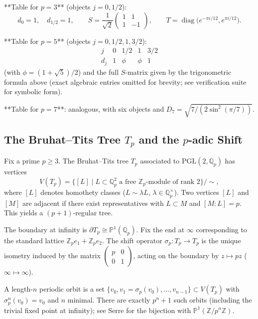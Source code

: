 \documentclass[11pt,a4paper]{amsart}
\begin{document}
**Table for \(p=3\)** (objects \(j=0,1/2\)):
\[
d_0=1,\quad d_{1/2}=1,\qquad
S = \frac{1}{\sqrt{2}}\begin{pmatrix}1&1\\1&-1\end{pmatrix},\qquad
T = \operatorname{diag}\bigl(e^{-\pi i/12},e^{\pi i/12}\bigr).
\]

**Table for \(p=5\)** (objects \(j=0,1/2,1,3/2\)):
\[
\begin{array}{c|cccc}
j & 0 & 1/2 & 1 & 3/2 \\ \hline
d_j & 1 & \phi & \phi & 1
\end{array}
\]
(with \(\phi = (1+\sqrt{5})/2\)) and the full \(S\)-matrix given by the trigonometric formula above (exact algebraic entries omitted for brevity; see verification suite for symbolic form).

**Table for \(p=7\)**: analogous, with six objects and \(D_7 = \sqrt{7/(2\sin^2(\pi/7))}\).

\subsection{The Bruhat--Tits Tree \(T_p\) and the \(p\)-adic Shift}
\label{subsec:tree}

Fix a prime \(p\geq 3\). The Bruhat--Tits tree \(T_p\) associated to \(\mathrm{PGL}(2,\mathbb{Q}_p)\) has vertices
\[
V(T_p) = \{[L]\mid L\subset\mathbb{Q}_p^2\text{ a free }\mathbb{Z}_p\text{-module of rank 2}\}/\sim,
\]
where \([L]\) denotes homothety classes (\(L\sim\lambda L\), \(\lambda\in\mathbb{Q}_p^\times\)). Two vertices \([L]\) and \([M]\) are adjacent if there exist representatives with \(L\subset M\) and \([M:L]=p\). This yields a \((p+1)\)-regular tree.

The boundary at infinity is \(\partial T_p\cong\mathbb{P}^1(\mathbb{Q}_p)\). Fix the end at \(\infty\) corresponding to the standard lattice \(\mathbb{Z}_p e_1+\mathbb{Z}_p e_2\). The shift operator \(\sigma_p:T_p\to T_p\) is the unique isometry induced by the matrix \(\begin{pmatrix}p&0\\0&1\end{pmatrix}\), acting on the boundary by \(z\mapsto pz\) (\(\infty\mapsto\infty\)).

A length-\(n\) periodic orbit is a set \(\{v_0,v_1=\sigma_p(v_0),\dots,v_{n-1}\}\subset V(T_p)\) with \(\sigma_p^n(v_0)=v_0\) and \(n\) minimal. There are exactly \(p^n+1\) such orbits (including the trivial fixed point at infinity); see Serre \cite{Serre80} for the bijection with \(\mathbb{P}^1(\mathbb{Z}/p^n\mathbb{Z})\).
\end{document}
